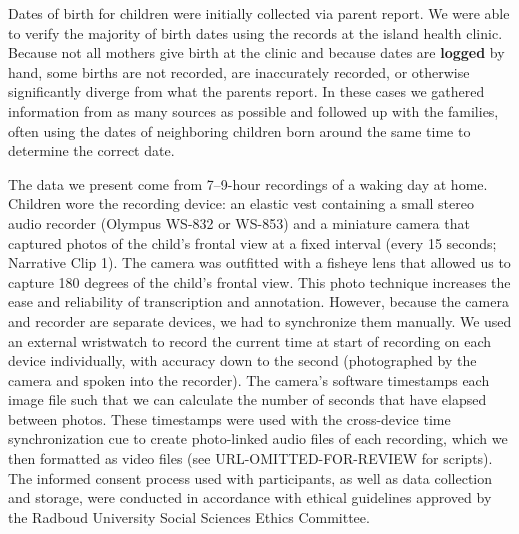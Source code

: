 \documentclass[,man,floatsintext]{apa6}
\begin{document}
Dates of birth for children were initially collected via parent report.
We were able to verify the majority of birth dates using the records at
the island health clinic. Because not all mothers give birth at the
clinic and because dates are \textbf{logged} by hand, some births are
not recorded, are inaccurately recorded, or otherwise significantly
diverge from what the parents report. In these cases we gathered
information from as many sources as possible and followed up with the
families, often using the dates of neighboring children born around the
same time to determine the correct date.

The data we present come from 7--9-hour recordings of a waking day at
home. Children wore the recording device: an elastic vest containing a
small stereo audio recorder (Olympus WS-832 or WS-853) and a miniature
camera that captured photos of the child's frontal view at a fixed
interval (every 15 seconds; Narrative Clip 1). The camera was outfitted
with a fisheye lens that allowed us to capture 180 degrees of the
child's frontal view. This photo technique increases the ease and
reliability of transcription and annotation. However, because the camera
and recorder are separate devices, we had to synchronize them manually.
We used an external wristwatch to record the current time at start of
recording on each device individually, with accuracy down to the second
(photographed by the camera and spoken into the recorder). The camera's
software timestamps each image file such that we can calculate the
number of seconds that have elapsed between photos. These timestamps
were used with the cross-device time synchronization cue to create
photo-linked audio files of each recording, which we then formatted as
video files (see URL-OMITTED-FOR-REVIEW for scripts). The informed
consent process used with participants, as well as data collection and
storage, were conducted in accordance with ethical guidelines approved
by the Radboud University Social Sciences Ethics Committee.
\end{document}
